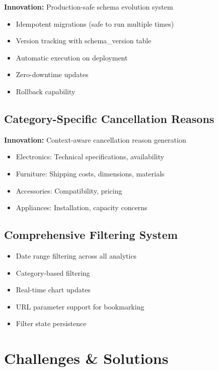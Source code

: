 \documentclass[12pt,a4paper]{article}
\begin{document}
\textbf{Innovation:} Production-safe schema evolution system

\begin{itemize}[leftmargin=*]
    \item Idempotent migrations (safe to run multiple times)
    \item Version tracking with schema\_version table
    \item Automatic execution on deployment
    \item Zero-downtime updates
    \item Rollback capability
\end{itemize}

\subsection{Category-Specific Cancellation Reasons}

\textbf{Innovation:} Context-aware cancellation reason generation

\begin{itemize}[leftmargin=*]
    \item Electronics: Technical specifications, availability
    \item Furniture: Shipping costs, dimensions, materials
    \item Accessories: Compatibility, pricing
    \item Appliances: Installation, capacity concerns
\end{itemize}

\subsection{Comprehensive Filtering System}

\begin{itemize}[leftmargin=*]
    \item Date range filtering across all analytics
    \item Category-based filtering
    \item Real-time chart updates
    \item URL parameter support for bookmarking
    \item Filter state persistence
\end{itemize}

\newpage

\section{Challenges \& Solutions}
\end{document}
